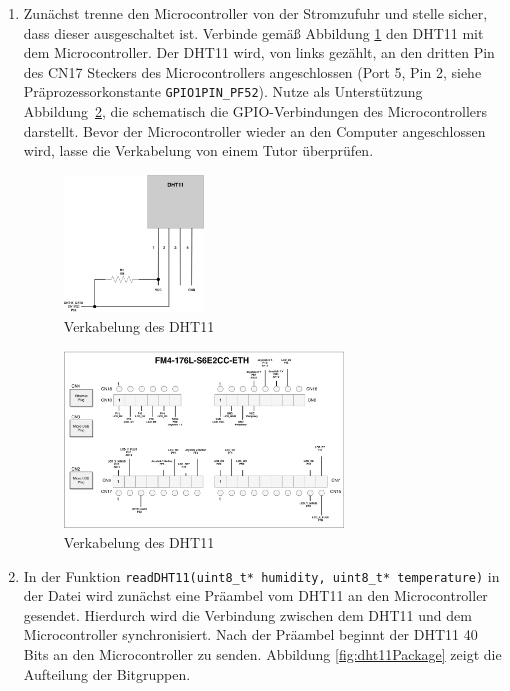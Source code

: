 \begin{enumerate}
\item 
Zunächst trenne den Microcontroller von der Stromzufuhr und stelle sicher, dass dieser ausgeschaltet ist.
Verbinde gemäß Abbildung \ref{fig:dht11Schematics} den DHT11 mit dem Microcontroller.
Der DHT11 wird, von links gezählt, an den dritten Pin des CN17 Steckers des Microcontrollers angeschlossen (Port 5, Pin 2, siehe Prä\-pro\-zes\-sor\-kon\-stan\-te \lstinline|GPIO1PIN_PF52|).
Nutze als Unterstützung Abbildung~\ref{fig:cpppWiring}, die schematisch die GPIO-Verbindungen des Microcontrollers darstellt.
Bevor der Microcontroller wieder an den Computer angeschlossen wird, lasse die Verkabelung von einem Tutor überprüfen.
%
\begin{figure}[!htb]
	\centering
	\includegraphics[width=0.35\textwidth]{./05_c/figures/DHT11-Schematics.pdf}
	\caption{Verkabelung des DHT11}
	\label{fig:dht11Schematics}
\end{figure} 
\begin{figure}[!htb]
	\centering
	\includegraphics[width=0.7\textwidth]{./05_c/figures/cppp-wiring.pdf}
	\caption{Verkabelung des DHT11}
	\label{fig:cpppWiring}
\end{figure} 

\item 
In der Funktion \lstinline|readDHT11(uint8_t* humidity, uint8_t* temperature)| in der Datei  wird zunächst eine Präambel vom DHT11 an den Microcontroller gesendet.
Hierdurch wird die Verbindung zwischen dem DHT11 und dem Microcontroller synchronisiert. 
Nach der Präambel beginnt der DHT11 40 Bits an den Microcontroller zu senden.
Abbildung \ref{fig:dht11Package} zeigt die Aufteilung der Bitgruppen.


\end{enumerate}
